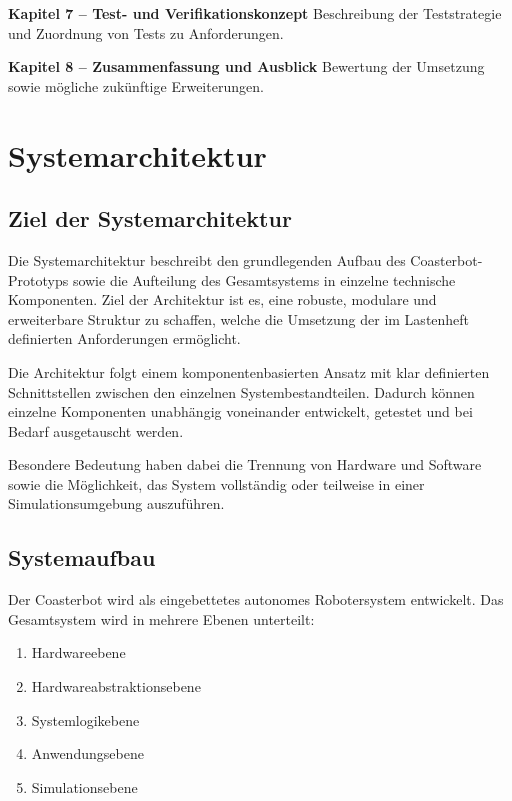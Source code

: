 \documentclass[
  a4paper,
  12pt,
  DIV=12,        %
  parskip=half,  %
  headings=small %
]{scrartcl}
\theoremstyle{definition}
\providecommand{\tightlist}{%
  \setlength{\itemsep}{0pt}\setlength{\parskip}{0pt}}
\theoremstyle{definition}
\begin{document}
\textbf{Kapitel 7 -- Test- und Verifikationskonzept} Beschreibung der
Teststrategie und Zuordnung von Tests zu Anforderungen.

\textbf{Kapitel 8 -- Zusammenfassung und Ausblick} Bewertung der
Umsetzung sowie mögliche zukünftige Erweiterungen.

\section{Systemarchitektur}\label{systemarchitektur}

\subsection{Ziel der
Systemarchitektur}\label{ziel-der-systemarchitektur}

Die Systemarchitektur beschreibt den grundlegenden Aufbau des
Coasterbot-Prototyps sowie die Aufteilung des Gesamtsystems in einzelne
technische Komponenten. Ziel der Architektur ist es, eine robuste,
modulare und erweiterbare Struktur zu schaffen, welche die Umsetzung der
im Lastenheft definierten Anforderungen ermöglicht.

Die Architektur folgt einem komponentenbasierten Ansatz mit klar
definierten Schnittstellen zwischen den einzelnen Systembestandteilen.
Dadurch können einzelne Komponenten unabhängig voneinander entwickelt,
getestet und bei Bedarf ausgetauscht werden.

Besondere Bedeutung haben dabei die Trennung von Hardware und Software
sowie die Möglichkeit, das System vollständig oder teilweise in einer
Simulationsumgebung auszuführen.

\subsection{Systemaufbau}\label{systemaufbau}

Der Coasterbot wird als eingebettetes autonomes Robotersystem
entwickelt. Das Gesamtsystem wird in mehrere Ebenen unterteilt:

\begin{enumerate}
\def\labelenumi{\arabic{enumi}.}
\tightlist
\item
  Hardwareebene
\item
  Hardwareabstraktionsebene
\item
  Systemlogikebene
\item
  Anwendungsebene
\item
  Simulationsebene
\end{enumerate}
\end{document}
